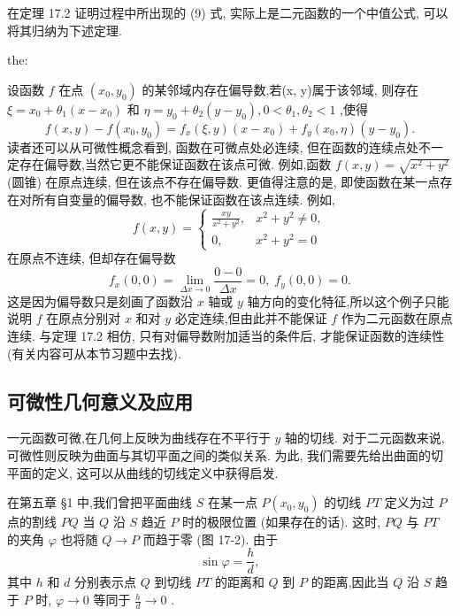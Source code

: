在定理 17.2 证明过程中所出现的 (9) 式, 实际上是二元函数的一个中值公式, 可以将其归纳为下述定理.

\begin{theorem}{}{the:}

\end{theorem}
 设函数 \(f\) 在点 \(\left( {{x}_{0},{y}_{0}}\right)\) 的某邻域内存在偏导数,若(x, y)属于该邻域, 则存在 \(\xi  = {x}_{0} + {\theta }_{1}\left( {x - {x}_{0}}\right)\) 和 \(\eta  = {y}_{0} + {\theta }_{2}\left( {y - {y}_{0}}\right) ,0 < {\theta }_{1},{\theta }_{2} < 1\) ,使得
\[
f\left( {x,y}\right)  - f\left( {{x}_{0},{y}_{0}}\right)  = {f}_{x}\left( {\xi ,y}\right) \left( {x - {x}_{0}}\right)  + {f}_{y}\left( {{x}_{0},\eta }\right) \left( {y - {y}_{0}}\right) . \tag{12}
\]
读者还可以从可微性概念看到, 函数在可微点处必连续, 但在函数的连续点处不一定存在偏导数,当然它更不能保证函数在该点可微. 例如,函数 \(f\left( {x,y}\right)  = \sqrt{{x}^{2} + {y}^{2}}\) (圆锥) 在原点连续, 但在该点不存在偏导数. 更值得注意的是, 即使函数在某一点存在对所有自变量的偏导数, 也不能保证函数在该点连续. 例如,
\[
f\left( {x,y}\right)  = \left\{  \begin{matrix} \frac{xy}{{x}^{2} + {y}^{2}}, & {x}^{2} + {y}^{2} \neq  0, \\  0, & {x}^{2} + {y}^{2} = 0 \end{matrix}\right.
\]
在原点不连续, 但却存在偏导数
\[
{f}_{x}\left( {0,0}\right)  = \mathop{\lim }\limits_{{{\Delta x} \rightarrow  0}}\frac{0 - 0}{\Delta x} = 0,\;{f}_{y}\left( {0,0}\right)  = 0.
\]
这是因为偏导数只是刻画了函数沿 \(x\) 轴或 \(y\) 轴方向的变化特征,所以这个例子只能说明 \(f\) 在原点分别对 \(x\) 和对 \(y\) 必定连续,但由此并不能保证 \(f\) 作为二元函数在原点连续. 与定理 17.2 相仿, 只有对偏导数附加适当的条件后, 才能保证函数的连续性 (有关内容可从本节习题中去找).

\subsection{可微性几何意义及应用}

一元函数可微,在几何上反映为曲线存在不平行于 \(y\) 轴的切线. 对于二元函数来说, 可微性则反映为曲面与其切平面之间的类似关系. 为此, 我们需要先给出曲面的切平面的定义, 这可以从曲线的切线定义中获得启发.

在第五章 §1 中,我们曾把平面曲线 \(S\) 在某一点 \(P\left( {{x}_{0},{y}_{0}}\right)\) 的切线 \({PT}\) 定义为过 \(P\) 点的割线 \({PQ}\) 当 \(Q\) 沿 \(S\) 趋近 \(P\) 时的极限位置 (如果存在的话). 这时, \({PQ}\) 与 \({PT}\) 的夹角 \(\varphi\) 也将随 \(Q \rightarrow  P\) 而趋于零 (图 17-2). 由于
\[
\sin \varphi  = \frac{h}{d},
\]
其中 \(h\) 和 \(d\) 分别表示点 \(Q\) 到切线 \({PT}\) 的距离和 \(Q\) 到 \(P\) 的距离,因此当 \(Q\) 沿 \(S\) 趋于 \(P\) 时, \(\varphi  \rightarrow  0\) 等同于 \(\frac{h}{d} \rightarrow  0\) .

